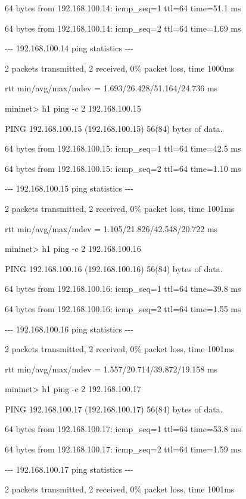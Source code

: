 64 bytes from 192.168.100.14: icmp\_seq=1 ttl=64 time=51.1 ms

64 bytes from 192.168.100.14: icmp\_seq=2 ttl=64 time=1.69 ms


\bigskip

{}-{}-{}- 192.168.100.14 ping statistics -{}-{}-

2 packets transmitted, 2 received, 0\% packet loss, time 1000ms

rtt min/avg/max/mdev = 1.693/26.428/51.164/24.736 ms

mininet{\textgreater} h1 ping -c 2 192.168.100.15

PING 192.168.100.15 (192.168.100.15) 56(84) bytes of data.

64 bytes from 192.168.100.15: icmp\_seq=1 ttl=64 time=42.5 ms

64 bytes from 192.168.100.15: icmp\_seq=2 ttl=64 time=1.10 ms


\bigskip

{}-{}-{}- 192.168.100.15 ping statistics -{}-{}-

2 packets transmitted, 2 received, 0\% packet loss, time 1001ms

rtt min/avg/max/mdev = 1.105/21.826/42.548/20.722 ms

mininet{\textgreater} h1 ping -c 2 192.168.100.16

PING 192.168.100.16 (192.168.100.16) 56(84) bytes of data.

64 bytes from 192.168.100.16: icmp\_seq=1 ttl=64 time=39.8 ms

64 bytes from 192.168.100.16: icmp\_seq=2 ttl=64 time=1.55 ms


\bigskip

{}-{}-{}- 192.168.100.16 ping statistics -{}-{}-

2 packets transmitted, 2 received, 0\% packet loss, time 1001ms

rtt min/avg/max/mdev = 1.557/20.714/39.872/19.158 ms

mininet{\textgreater} h1 ping -c 2 192.168.100.17

PING 192.168.100.17 (192.168.100.17) 56(84) bytes of data.

64 bytes from 192.168.100.17: icmp\_seq=1 ttl=64 time=53.8 ms

64 bytes from 192.168.100.17: icmp\_seq=2 ttl=64 time=1.59 ms


\bigskip

{}-{}-{}- 192.168.100.17 ping statistics -{}-{}-

2 packets transmitted, 2 received, 0\% packet loss, time 1001ms

